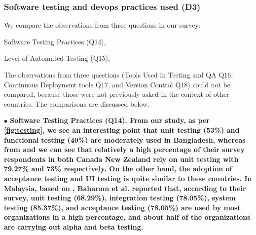 \subsubsection{Software testing and devops practices used (D3)}\label{sec:rq2-d3}
% 
We compare the observations from three questions in our survey: \begin{inparaenum}
\item Software Testing Practices (Q14),
\item Level of Automated Testing (Q15),
\end{inparaenum} The observations from three questions (Tools Used in Testing and QA Q16, Continuous Deployment tools Q17, and Version Control Q18) could not be compared, because 
those were not previously asked in the context of other countries. The comparisons are discussed below.


\nd\bf{$\bullet$ Software Testing Practices (Q14)}. From our study, as per
\ref{fig:testing}, we see an interesting point that unit testing (53\%) and
functional testing (49\%) are moderately used in Bangladesh, whereas from
\citep{Garousi2013} and \citep{Wang2018} we can see that relatively a high
percentage of their survey respondents in both Canada New Zealand rely on unit
testing with 79.27\% and 73\% respectively. On the other hand, the adoption of
acceptance testing and UI testing is quite similar to these countries. In
Malaysia, based on \citep{Baharom2006}, Baharom et al. reported that, according
to their survey, unit testing (68.29\%), integration testing (78.05\%), system
testing (85.37\%), and acceptance testing (78.05\%) are used by most
organizations in a high percentage, and about half of the organizations are
carrying out alpha and beta testing.

